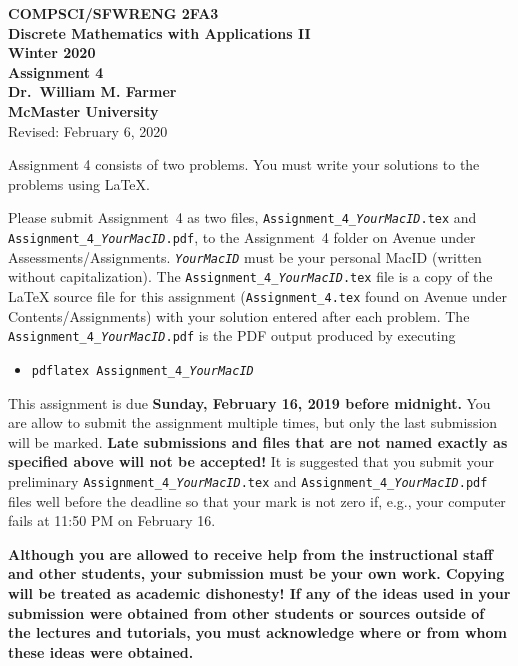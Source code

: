\documentclass[11pt,fleqn]{article}
\begin{document}
\begin{center}

  {\large \textbf{COMPSCI/SFWRENG 2FA3}}\\[2mm]
  {\large \textbf{Discrete Mathematics with Applications II}}\\[2mm]
  {\large \textbf{Winter 2020}}\\[8mm]
  {\huge \textbf{Assignment 4}}\\[6mm]
  {\large \textbf{Dr.~William M. Farmer}}\\[2mm]
  {\large \textbf{McMaster University}}\\[6mm]
  {\large Revised: February 6, 2020}

\end{center}

\medskip

Assignment 4 consists of two problems.  You must write your solutions
to the problems using LaTeX.

Please submit Assignment~4 as two files,
\texttt{Assignment\_4\_\emph{YourMacID}.tex} and
\texttt{Assignment\_4\_\emph{YourMacID}.pdf}, to the Assignment~4
folder on Avenue under Assessments/Assignments.
\texttt{\emph{YourMacID}} must be your personal MacID (written without
capitalization).  The \texttt{Assignment\_4\_\emph{YourMacID}.tex}
file is a copy of the LaTeX source file for this assignment
(\texttt{Assignment\_4.tex} found on Avenue under
Contents/Assignments) with your solution entered after each problem.
The \texttt{Assignment\_4\_\emph{YourMacID}.pdf} is the PDF output
produced by executing

\begin{itemize}

  \item[] \texttt{pdflatex Assignment\_4\_\emph{YourMacID}}

\end{itemize}

This assignment is due \textbf{Sunday, February 16, 2019 before
  midnight.}  You are allow to submit the assignment multiple times,
but only the last submission will be marked.  \textbf{Late submissions
  and files that are not named exactly as specified above will not be
  accepted!}  It is suggested that you submit your preliminary
\texttt{Assignment\_4\_\emph{YourMacID}.tex} and
\texttt{Assignment\_4\_\emph{YourMacID}.pdf} files well before the
deadline so that your mark is not zero if, e.g., your computer fails
at 11:50 PM on February 16.

\textbf{Although you are allowed to receive help from the
  instructional staff and other students, your submission must be your
  own work.  Copying will be treated as academic dishonesty! If any of
  the ideas used in your submission were obtained from other students
  or sources outside of the lectures and tutorials, you must
  acknowledge where or from whom these ideas were obtained.}
\end{document}
